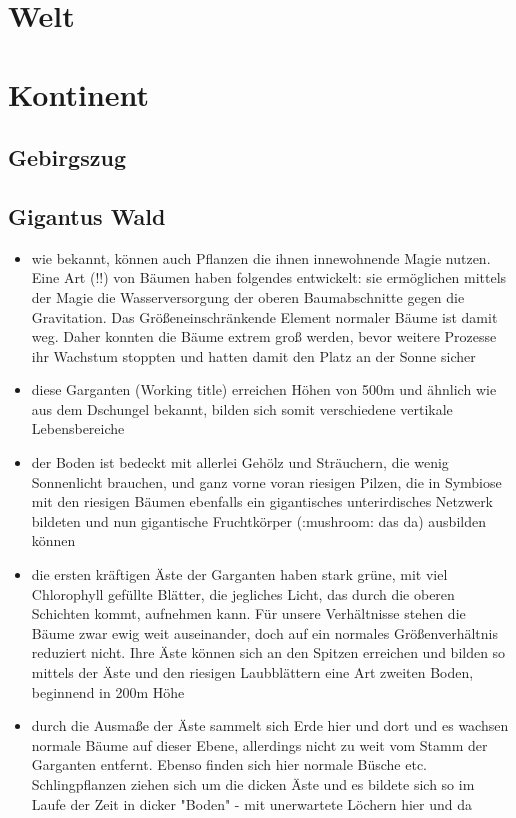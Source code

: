 \section{Welt}
\section{Kontinent}
\subsection{Gebirgszug}
\subsection{Gigantus Wald} \label{formation:gigantus}
\begin{itemize}
	\item wie bekannt, können auch Pflanzen die ihnen innewohnende Magie nutzen. Eine Art (!!) von Bäumen haben folgendes entwickelt: sie ermöglichen mittels der Magie die Wasserversorgung der oberen Baumabschnitte gegen die Gravitation. Das Größeneinschränkende Element normaler Bäume ist damit weg. Daher konnten die Bäume extrem groß werden, bevor weitere Prozesse ihr Wachstum stoppten und hatten damit den Platz an der Sonne sicher
	\item  diese Garganten (Working title) erreichen Höhen von 500m und ähnlich wie aus dem Dschungel bekannt, bilden sich somit verschiedene vertikale Lebensbereiche
	\item der Boden ist bedeckt mit allerlei Gehölz und Sträuchern, die wenig Sonnenlicht brauchen, und ganz vorne voran riesigen Pilzen, die in Symbiose mit den riesigen Bäumen ebenfalls ein gigantisches unterirdisches Netzwerk bildeten und nun gigantische Fruchtkörper (:mushroom:  das da) ausbilden können
	\item die ersten kräftigen Äste der Garganten haben stark grüne, mit viel Chlorophyll gefüllte Blätter, die jegliches Licht, das durch die oberen Schichten kommt, aufnehmen kann. Für unsere Verhältnisse stehen die Bäume zwar ewig weit auseinander, doch auf ein normales Größenverhältnis reduziert nicht. Ihre Äste können sich an den Spitzen erreichen und bilden so mittels der Äste und den riesigen Laubblättern eine Art zweiten Boden, beginnend in 200m Höhe
	\item durch die Ausmaße der Äste sammelt sich Erde hier und dort und es wachsen normale Bäume auf dieser Ebene, allerdings nicht zu weit vom Stamm der Garganten entfernt. Ebenso finden sich hier normale Büsche etc. Schlingpflanzen ziehen sich um die dicken Äste und es bildete sich so im Laufe der Zeit in dicker "Boden" - mit unerwartete Löchern hier und da

\end{itemize}
